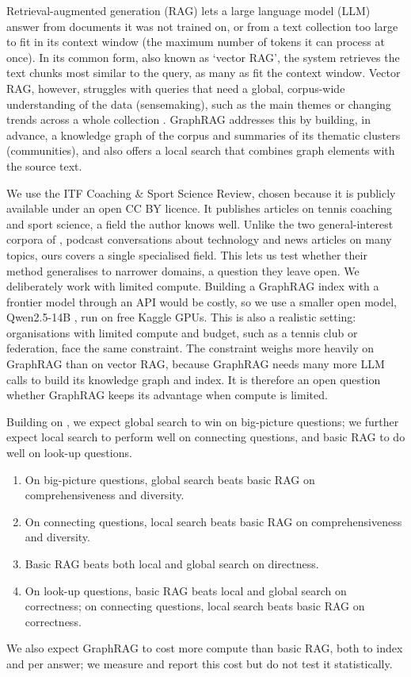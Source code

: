 \documentclass{article}
\begin{document}
Retrieval-augmented generation (RAG) \cite{lewis2020rag} lets a large language model (LLM) answer
from documents it was not trained on, or from a text collection too large to fit in its context window (the maximum number of tokens it can process at once). 
In its common form, also known as `vector RAG', the system retrieves the text chunks most similar to the query, as many as fit the context window. Vector RAG,
however, struggles with queries that need a global, corpus-wide understanding of the data
(sensemaking), such as the main themes or changing trends across a whole collection
\cite{edge2024local}. GraphRAG \cite{edge2024local} addresses this by building, in advance, a
knowledge graph of the corpus and summaries of its thematic clusters (communities), and also offers
a local search that combines graph elements with the source text.

We use the ITF Coaching \& Sport Science Review, chosen because it is publicly available under an
open CC BY licence. It publishes articles on tennis coaching and sport science, a field the author
knows well.
Unlike the two general-interest corpora of \citet{edge2024local}, podcast
conversations about technology and news articles on many topics, ours covers a single specialised
field. This lets us test whether their method generalises
to narrower domains, a question they leave open.
We deliberately work with limited compute. Building a GraphRAG index with a frontier model through an
API would be costly, so we use a smaller open model, Qwen2.5-14B \cite{qwen2025}, run on free Kaggle
GPUs. This is also a realistic setting: organisations with limited compute and budget, such as a
tennis club or federation, face the same constraint. The constraint weighs more heavily on GraphRAG
than on vector RAG, because GraphRAG needs many more LLM calls to build its knowledge graph and index.
It is therefore an open question whether GraphRAG keeps its advantage when compute is limited.

Building on \citet{edge2024local}, we expect global search to win on big-picture
questions; we further expect local search to perform well on connecting questions, and basic RAG to
do well on look-up questions.
\begin{enumerate}[label=\textbf{H\arabic*},leftmargin=*,nosep]
  \item On big-picture questions, global search beats basic RAG on comprehensiveness and diversity.
  \item On connecting questions, local search beats basic RAG on comprehensiveness and diversity.
  \item Basic RAG beats both local and global search on directness.
  \item On look-up questions, basic RAG beats local and global search on correctness; on connecting
    questions, local search beats basic RAG on correctness.
\end{enumerate}
We also expect GraphRAG to cost more compute than basic RAG, both to index and per answer; we measure
and report this cost but do not test it statistically.
\end{document}
